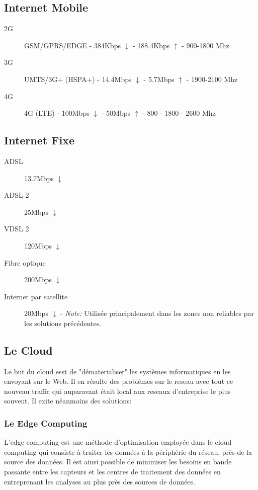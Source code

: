 \documentclass[a4paper, 12pt, french]{article}
\begin{document}
	\subsection{Internet Mobile}  
	\begin{description}
		\item[2G] GSM/GPRS/EDGE - 384Kbps $\downarrow$ - 188.4Kbps $\uparrow$ - 900-1800 Mhz
		\item[3G] UMTS/3G+ (HSPA+) - 14.4Mbps $\downarrow$ - 5.7Mbps $\uparrow$ - 1900-2100 Mhz
		\item[4G] 4G (LTE) - 100Mbps $\downarrow$ - 50Mbps $\uparrow$ - 800 - 1800 - 2600 Mhz
	\end{description}

	\subsection{Internet Fixe}  
	\begin{description}
		\item[ADSL] 13.7Mbps $\downarrow$
		\item[ADSL 2] 25Mbps $\downarrow$
		\item[VDSL 2] 120Mbps $\downarrow$
		\item[Fibre optique] 200Mbps $\downarrow$
		\item[Internet par satellite] 20Mbps $\downarrow$ - \emph{Note:} Utilisée principalement dans les zones non reliables par les solutions précédentes.
	\end{description}

	\subsection{Le Cloud}

	Le but du cloud esst de "dématerialiser" les systèmes informatiques en les envoyant sur le Web. Il en résulte des problèmes sur le reseau avec tout ce nouveau traffic qui auparavant était local aux reseaux d'entreprise le plus souvent. Il exite néanmoins des solutions:

	\subsubsection{Le Edge Computing}

	L'edge computing est une méthode d'optimisation employée dans le cloud computing qui consiste à traiter les données à la périphérie du réseau, près de la source des données. Il est ainsi possible de minimiser les besoins en bande passante entre les capteurs et les centres de traitement des données en entreprenant les analyses au plus près des sources de données.
\end{document}
